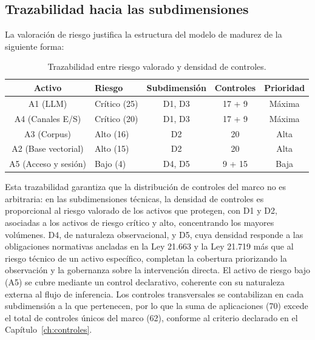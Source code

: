 \subsection{Trazabilidad hacia las subdimensiones}

La valoración de riesgo justifica la estructura del modelo de madurez de la siguiente forma:

\begin{table}[H]
  \centering
  \caption{Trazabilidad entre riesgo valorado y densidad de controles.}
  \label{tab:trazabilidad-riesgo}
  \begin{tabularx}{\textwidth}{@{} c l c c c @{}}
    \toprule
    \textbf{Activo} & \textbf{Riesgo} & \textbf{Subdimensión} & \textbf{Controles} & \textbf{Prioridad} \\
    \midrule
    A1 (LLM)             & Crítico (25) & D1, D3 & 17 + 9 & Máxima \\
    A4 (Canales E/S)     & Crítico (20) & D1, D3 & 17 + 9 & Máxima \\
    A3 (Corpus)           & Alto (16) & D2     & 20      & Alta \\
    A2 (Base vectorial)   & Alto (15) & D2     & 20      & Alta \\
    A5 (Acceso y sesión)  & Bajo (4) & D4, D5 & 9 + 15 & Baja \\
    \bottomrule
  \end{tabularx}
\end{table}

\vspace{6pt}

Esta trazabilidad garantiza que la distribución de controles del marco no es arbitraria: en las subdimensiones técnicas, la densidad de controles es proporcional al riesgo valorado de los activos que protegen, con D1 y D2, asociadas a los activos de riesgo crítico y alto, concentrando los mayores volúmenes. D4, de naturaleza observacional, y D5, cuya densidad responde a las obligaciones normativas ancladas en la Ley 21.663 y la Ley 21.719 más que al riesgo técnico de un activo específico, completan la cobertura priorizando la observación y la gobernanza sobre la intervención directa. El activo de riesgo bajo (A5) se cubre mediante un control declarativo, coherente con su naturaleza externa al flujo de inferencia. Los controles transversales se contabilizan en cada subdimensión a la que pertenecen, por lo que la suma de aplicaciones (70) excede el total de controles únicos del marco (62), conforme al criterio declarado en el Capítulo~\ref{ch:controles}.

